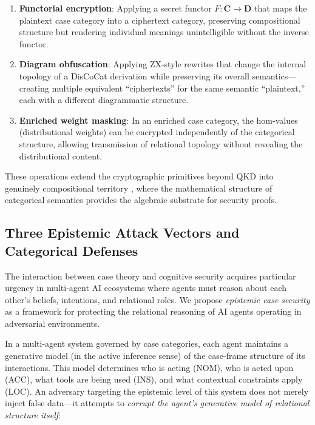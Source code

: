 \documentclass[
]{article}
\providecommand{\tightlist}{%
  \setlength{\itemsep}{0pt}\setlength{\parskip}{0pt}}
\begin{document}
\begin{enumerate}
\def\labelenumi{\arabic{enumi}.}
\tightlist
\item
  \textbf{Functorial encryption}: Applying a secret functor
  \(F\colon \mathbf{C} \to \mathbf{D}\) that maps the plaintext case
  category into a ciphertext category, preserving compositional
  structure but rendering individual meanings unintelligible without the
  inverse functor.
\item
  \textbf{Diagram obfuscation}: Applying ZX-style rewrites that change
  the internal topology of a DisCoCat derivation while preserving its
  overall semantics---creating multiple equivalent ``ciphertexts'' for
  the same semantic ``plaintext,'' each with a different diagrammatic
  structure.
\item
  \textbf{Enriched weight masking}: In an enriched case category, the
  hom-values (distributional weights) can be encrypted independently of
  the categorical structure, allowing transmission of relational
  topology without revealing the distributional content.
\end{enumerate}

These operations extend the cryptographic primitives beyond QKD into
genuinely compositional territory \citep{broadbent2016qcrypto}, where
the mathematical structure of categorical semantics provides the
algebraic substrate for security proofs.

\subsection{Three Epistemic Attack Vectors and Categorical
Defenses}\label{three-epistemic-attack-vectors-and-categorical-defenses}

The interaction between case theory and cognitive security acquires
particular urgency in multi-agent AI ecosystems where agents must reason
about each other's beliefs, intentions, and relational roles. We propose
\emph{epistemic case security} as a framework for protecting the
relational reasoning of AI agents operating in adversarial environments.

In a multi-agent system governed by case categories, each agent
maintains a generative model (in the active inference sense) of the
case-frame structure of its interactions. This model determines who is
acting (NOM), who is acted upon (ACC), what tools are being used (INS),
and what contextual constraints apply (LOC). An adversary targeting the
epistemic level of this system does not merely inject false data---it
attempts to \emph{corrupt the agent's generative model of relational
structure itself}:
\end{document}
